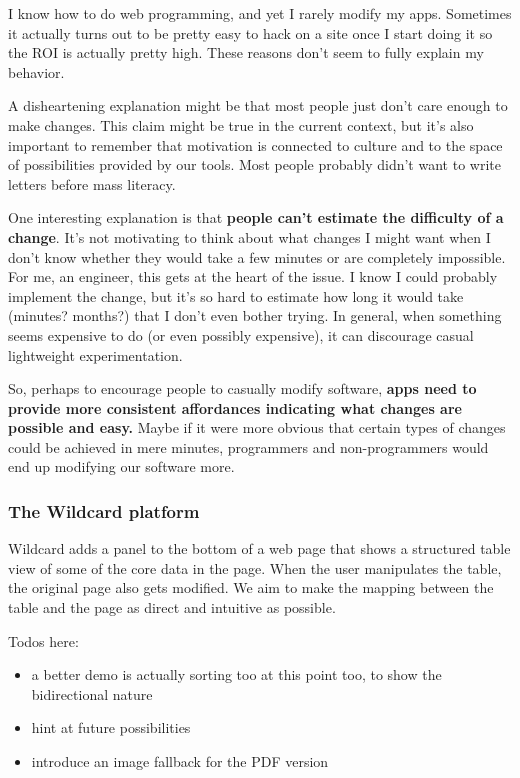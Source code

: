 \documentclass[english,submission]{programming}
\providecommand{\tightlist}{%
  \setlength{\itemsep}{0pt}\setlength{\parskip}{0pt}}
\begin{document}
I know how to do web programming, and yet I rarely modify my apps.
Sometimes it actually turns out to be pretty easy to hack on a site once
I start doing it so the ROI is actually pretty high. These reasons don't
seem to fully explain my behavior.

A disheartening explanation might be that most people just don't care
enough to make changes. This claim might be true in the current context,
but it's also important to remember that motivation is connected to
culture and to the space of possibilities provided by our tools. Most
people probably didn't want to write letters before mass literacy.

One interesting explanation is that \textbf{people can't estimate the
difficulty of a change}. It's not motivating to think about what changes
I might want when I don't know whether they would take a few minutes or
are completely impossible. For me, an engineer, this gets at the heart
of the issue. I know I could probably implement the change, but it's so
hard to estimate how long it would take (minutes? months?) that I don't
even bother trying. In general, when something seems expensive to do (or
even possibly expensive), it can discourage casual lightweight
experimentation.

So, perhaps to encourage people to casually modify software,
\textbf{apps need to provide more consistent affordances indicating what
changes are possible and easy.} Maybe if it were more obvious that
certain types of changes could be achieved in mere minutes, programmers
and non-programmers would end up modifying our software more.

\hypertarget{the-wildcard-platform}{%
\subsubsection{The Wildcard platform}\label{the-wildcard-platform}}

Wildcard adds a panel to the bottom of a web page that shows a
structured table view of some of the core data in the page. When the
user manipulates the table, the original page also gets modified. We aim
to make the mapping between the table and the page as direct and
intuitive as possible.

Todos here:

\begin{itemize}
\tightlist
\item
  a better demo is actually sorting too at this point too, to show the
  bidirectional nature
\item
  hint at future possibilities
\item
  introduce an image fallback for the PDF version
\end{itemize}
\end{document}
